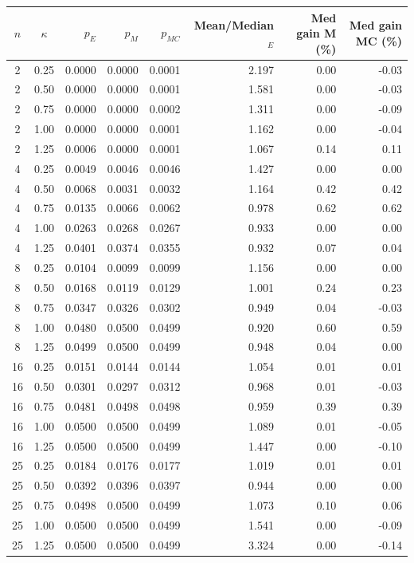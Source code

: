 \begin{tabular}{ccrrrrrr}
\toprule
$n$ & $\kappa$ & $p_E$ & $p_M$ & $p_{MC}$ & Mean/Median$_E$ & Med gain M (\%) & Med gain MC (\%) \\
\midrule
2 & 0.25 & 0.0000 & 0.0000 & 0.0001 & 2.197 & 0.00 & -0.03 \\
2 & 0.50 & 0.0000 & 0.0000 & 0.0001 & 1.581 & 0.00 & -0.03 \\
2 & 0.75 & 0.0000 & 0.0000 & 0.0002 & 1.311 & 0.00 & -0.09 \\
2 & 1.00 & 0.0000 & 0.0000 & 0.0001 & 1.162 & 0.00 & -0.04 \\
2 & 1.25 & 0.0006 & 0.0000 & 0.0001 & 1.067 & 0.14 & 0.11 \\
\midrule
4 & 0.25 & 0.0049 & 0.0046 & 0.0046 & 1.427 & 0.00 & 0.00 \\
4 & 0.50 & 0.0068 & 0.0031 & 0.0032 & 1.164 & 0.42 & 0.42 \\
4 & 0.75 & 0.0135 & 0.0066 & 0.0062 & 0.978 & 0.62 & 0.62 \\
4 & 1.00 & 0.0263 & 0.0268 & 0.0267 & 0.933 & 0.00 & 0.00 \\
4 & 1.25 & 0.0401 & 0.0374 & 0.0355 & 0.932 & 0.07 & 0.04 \\
\midrule
8 & 0.25 & 0.0104 & 0.0099 & 0.0099 & 1.156 & 0.00 & 0.00 \\
8 & 0.50 & 0.0168 & 0.0119 & 0.0129 & 1.001 & 0.24 & 0.23 \\
8 & 0.75 & 0.0347 & 0.0326 & 0.0302 & 0.949 & 0.04 & -0.03 \\
8 & 1.00 & 0.0480 & 0.0500 & 0.0499 & 0.920 & 0.60 & 0.59 \\
8 & 1.25 & 0.0499 & 0.0500 & 0.0499 & 0.948 & 0.04 & 0.00 \\
\midrule
16 & 0.25 & 0.0151 & 0.0144 & 0.0144 & 1.054 & 0.01 & 0.01 \\
16 & 0.50 & 0.0301 & 0.0297 & 0.0312 & 0.968 & 0.01 & -0.03 \\
16 & 0.75 & 0.0481 & 0.0498 & 0.0498 & 0.959 & 0.39 & 0.39 \\
16 & 1.00 & 0.0500 & 0.0500 & 0.0499 & 1.089 & 0.01 & -0.05 \\
16 & 1.25 & 0.0500 & 0.0500 & 0.0499 & 1.447 & 0.00 & -0.10 \\
\midrule
25 & 0.25 & 0.0184 & 0.0176 & 0.0177 & 1.019 & 0.01 & 0.01 \\
25 & 0.50 & 0.0392 & 0.0396 & 0.0397 & 0.944 & 0.00 & 0.00 \\
25 & 0.75 & 0.0498 & 0.0500 & 0.0499 & 1.073 & 0.10 & 0.06 \\
25 & 1.00 & 0.0500 & 0.0500 & 0.0499 & 1.541 & 0.00 & -0.09 \\
25 & 1.25 & 0.0500 & 0.0500 & 0.0499 & 3.324 & 0.00 & -0.14 \\
\bottomrule
\end{tabular}
